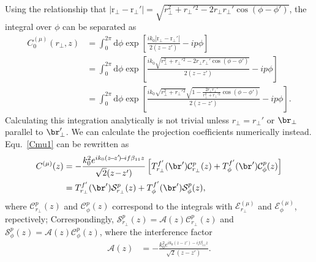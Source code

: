 Using the relationship that $ \left| \mathrm{r}_\perp - \mathrm{r}_\perp'\right|=\sqrt{r_\perp^2+{r_\perp'}\!\!^2 - 2 r_\perp r_\perp'\cos(\phi-\phi')} $, the integral over $ \phi $ can be separated as 
\begin{align}
C^{(\mu)}_0(r_\perp,z) &= \int_0^{2\pi} \!\!\! \mathrm{d}\phi  \exp\!\! \left[ \frac{ik_0 \left| \mathrm{r}_\perp\!\! -\! \mathrm{r}_\perp'\right|}{2(z-z')} \!-\! i p\phi \right]\\
&= \int_0^{2\pi} \!\!\! \mathrm{d}\phi  \exp\!\! \left[ \frac{ik_0 \sqrt{r_\perp^2+{r_\perp'}\!\!^2 - 2 r_\perp r_\perp'\cos(\phi-\phi')} }{2(z-z')} \!-\! i p\phi \right]\\
&= \int_0^{2\pi} \!\!\! \mathrm{d}\phi  \exp\!\! \left[ \frac{ik_0 \sqrt{r_\perp^2 \!+ {r_\perp'}\!\!^2}\sqrt{1 \!-\! \frac{2 r_\perp r_\perp'}{r_\perp^2 \!+ {r_\perp'}\!\!^2}\cos(\phi \!-\! \phi')} }{2(z-z')} \!-\! i p\phi \right].
\end{align}
Calculating this integration analytically is not trivial unless $ r_\perp=r_\perp' $ or $ \br_\perp $ parallel to $ \br_\perp' $. We can calculate the projection coefficients numerically instead. Equ.~\ref{Cmu1} can be rewritten as
\begin{align}
C^{(\mu)} (z) &= - \frac{k_0^2 e^{ik_0(z\!-\!z'\!)\!-\!if\beta_{11} z} }{\sqrt{2}(z\!-\!z')}\left[  T^{f'}_{r_\perp}(\br') \mathcal{C}_{r_\perp}^p (z) +  T^{f'}_\phi(\br') \mathcal{C}_{\phi}^p(z) \right]\\
&= T^{f'}_{r_\perp}(\br') \mathcal{S}_{r_\perp}^p (z) +  T^{f'}_\phi(\br') \mathcal{S}_{\phi}^p(z),
\end{align}
where $ \mathcal{C}_{r_\perp}^p(z) $ and $ \mathcal{C}_\phi^p(z) $ correspond to the integrals with $ \mathcal{E}^{(\mu)}_{r_\perp} $ and $ \mathcal{E}^{(\mu)}_{\phi} $, repectively; Correspondingly, $ \mathcal{S}_{r_\perp}^p(z)=\mathcal{A}(z)\mathcal{C}_{r_\perp}^p(z) $ and $ \mathcal{S}_{\phi}^p(z)=\mathcal{A}(z)\mathcal{C}_\phi^p(z) $, where the interference factor
\begin{align}
\mathcal{A}(z) &= - \frac{k_0^2  e^{ik_0(z\!-\!z'\!)\!-\!if\beta_{11} z}}{\sqrt{2}(z\!-\!z')}.
\end{align} 

